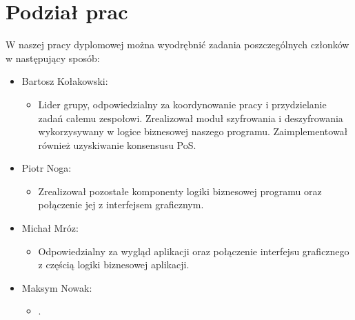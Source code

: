 \section{Podział prac}
W naszej pracy dyplomowej można wyodrębnić zadania poszczególnych członków w następujący sposób:
\begin{itemize}
    \item Bartosz Kołakowski:
        \begin{itemize}
            \item Lider grupy, odpowiedzialny za koordynowanie pracy i przydzielanie zadań całemu zespołowi. Zrealizował moduł szyfrowania i deszyfrowania wykorzysywany w logice biznesowej naszego programu. Zaimplementował również uzyskiwanie konsensusu PoS.  
        \end{itemize}
    \item Piotr Noga:
        \begin{itemize}
            \item Zrealizował pozostałe komponenty logiki biznesowej programu oraz połączenie jej z interfejsem graficznym.  
        \end{itemize}
    \item Michał Mróz:
        \begin{itemize}
            \item Odpowiedzialny za wygląd aplikacji oraz połączenie interfejsu graficznego z częścią logiki biznesowej aplikacji.  
        \end{itemize}
    \item Maksym Nowak:
        \begin{itemize}
            \item <do uzupełnienia>.  
        \end{itemize}
\end{itemize}